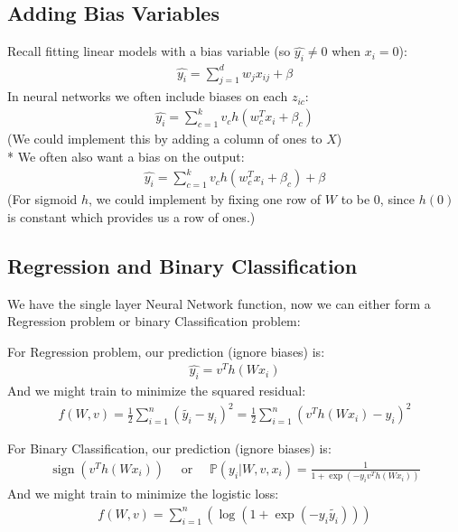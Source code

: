\subsection{Adding Bias Variables} \label{sec:}

Recall fitting linear models with a bias variable (so $\hat{y_i} \neq 0$ when $x_i = 0$):
\begin{align*}
    \hat{y_i} = \sum\limits_{j=1}^{d} w_jx_{ij}+\beta
\end{align*}
In neural networks we often include biases on each $z_{ic}$:
\begin{align*}
    \hat{y_i} = \sum\limits_{c=1}^{k} v_c h (w_c^{T}x_i + \beta_c)
\end{align*}
(We could implement this by adding a column of ones to $X$)
\\ * We often also want a bias on the output:
\begin{align*}
    \hat{y_i} = \sum\limits_{c=1}^{k} v_c h (w_c^{T}x_i + \beta_c) + \beta
\end{align*}
(For sigmoid $h$, we could implement by fixing one row of $W$ to be 0, since $h(0)$ is constant which provides us a row of ones.)

\subsection{Regression and Binary Classification} \label{sec:}
We have the single layer Neural Network function, now we can either form a Regression problem or binary Classification problem:
\begin{eg}
    For Regression problem, our prediction (ignore biases) is:
    \begin{align*}
        \hat{y_i} = v^{T}h(Wx_i)
    \end{align*}
    And we might train to minimize the squared residual:
    \begin{align*}
        f(W,v) = \frac{1}{2} \sum\limits_{i=1}^{n} (\tilde{y_i} - y_i)^{2} = \frac{1}{2} \sum\limits_{i=1}^{n} (v^{T}h(Wx_i) - y_i)^{2}
    \end{align*}
\end{eg}

\begin{eg}
    For Binary Classification, our prediction (ignore biases) is:
    \begin{align*}
        \operatorname{sign}(v^{T}h(Wx_i)) \quad \text{ or } \quad \mathbb{P}(y_i|W,v,x_i) = \frac{1}{1 + \exp(-y_i v^{T}h(Wx_i))}
    \end{align*}
    And we might train to minimize the logistic loss:
    \begin{align*}
        f(W,v) = \sum\limits_{i=1}^{n} (\log(1 + \exp(-y_i \tilde{y_i})))
    \end{align*}
\end{eg}

